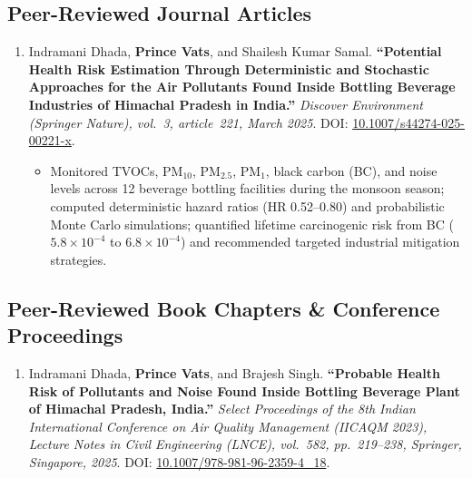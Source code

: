 \documentclass[10pt,a4paper]{article}
\newcommand{\pubitem}[4]{
    \item #1. \textbf{``#2.''} \textit{#3}. #4
}
\begin{document}
\subsection*{Peer-Reviewed Journal Articles}
\begin{enumerate}
    \pubitem{Indramani Dhada, \textbf{Prince Vats}, and Shailesh Kumar Samal}
    {Potential Health Risk Estimation Through Deterministic and Stochastic Approaches for the Air Pollutants Found Inside Bottling Beverage Industries of Himachal Pradesh in India}
    {Discover Environment (Springer Nature), vol.~3, article~221, March 2025}
    {DOI: \href{https://doi.org/10.1007/s44274-025-00221-x}{10.1007/s44274-025-00221-x}.}
    \begin{itemize}
        \item Monitored TVOCs, PM$_{10}$, PM$_{2.5}$, PM$_{1}$, black carbon (BC), and noise levels across 12 beverage bottling facilities during the monsoon season; computed deterministic hazard ratios (HR 0.52--0.80) and probabilistic Monte Carlo simulations; quantified lifetime carcinogenic risk from BC ($5.8\times 10^{-4}$ to $6.8\times 10^{-4}$) and recommended targeted industrial mitigation strategies.
    \end{itemize}
\end{enumerate}

\subsection*{Peer-Reviewed Book Chapters \& Conference Proceedings}
\begin{enumerate}[resume]
    \pubitem{Indramani Dhada, \textbf{Prince Vats}, and Brajesh Singh}
    {Probable Health Risk of Pollutants and Noise Found Inside Bottling Beverage Plant of Himachal Pradesh, India}
    {Select Proceedings of the 8th Indian International Conference on Air Quality Management (IICAQM 2023), Lecture Notes in Civil Engineering (LNCE), vol.~582, pp.~219--238, Springer, Singapore, 2025}
    {DOI: \href{https://doi.org/10.1007/978-981-96-2359-4_18}{10.1007/978-981-96-2359-4\_18}.}
\end{enumerate}
\end{document}
